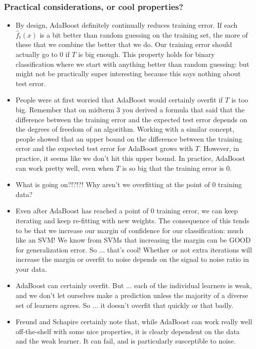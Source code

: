 \subsubsection{Practical considerations, or cool properties?}
\begin{itemize}
\item By design, AdaBoost definitely continually reduces training error. If each $\hat{f}_t(x)$ is a bit better than random guessing on the training set, the more of these that we combine the better that we do. Our training error should actually go to $0$ if $T$ is big enough. This property holds for binary classification where we start with anything better than random guessing: but might not be practically super interesting because this says nothing about test error. 
\item People were at first worried that AdaBoost would certainly overfit if $T$ is too big. Remember that on midterm 3 you derived a formula that said that the difference between the training error and the expected test error depends on the degrees of freedom of an algorithm. Working with a similar concept, people showed that an upper bound on the difference between the training error and the expected test error for AdaBoost grows with $T$. However, in practice, it seems like we don't hit this upper bound. In practice, AdaBoost can work pretty well, even when $T$ is so big that the training error is $0$. 
\item What is going on?!?!?! Why aren't we overfitting at the point of $0$ training data? 
\item Even after AdaBoost has reached a point of $0$ training error, we can keep iterating and keep re-fitting with new weights. The consequence of this tends to be that we increase our margin of confidence for our classification: much like an SVM! We know from SVMs that increasing the margin can be GOOD for generalization error. So ... that's cool! Whether or not extra iterations will increase the margin or overfit to noise depends on the signal to noise ratio in your data. 
\item AdaBoost can certainly overfit. But ... each of the individual learners is weak, and we don't let ourselves make a prediction unless the majority of a diverse set of learners agrees. So ... it doesn't overfit that quickly or that badly. 
\item Freund and Schapire certainly note that, while AdaBoost can work really well off-the-shelf with some nice properties, it is clearly dependent on the data and the weak learner. It can fail, and is particularly susceptible to noise. 
\end{itemize}


